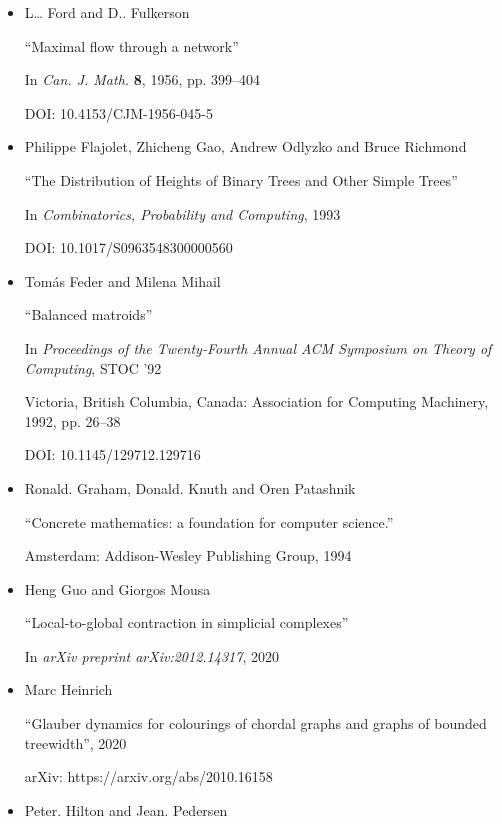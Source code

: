 \documentclass[10pt,a4paper]{article}
\begin{document}
\begin{itemize}
      

\item[] [FF56]
L… Ford and D.. Fulkerson

“Maximal flow through a network”

In \emph{Can. J. Math.} \textbf{8}, 1956, pp. 399–404

DOI: 10.4153/CJM-1956-045-5


      

\item[] [Fla+93]
Philippe Flajolet, Zhicheng Gao, Andrew Odlyzko and Bruce Richmond

“The Distribution of Heights of Binary Trees and Other Simple Trees”

In \emph{Combinatorics, Probability and Computing}, 1993

DOI: 10.1017/S0963548300000560


      

\item[] [FM92]
Tomás Feder and Milena Mihail

“Balanced matroids”

In \emph{Proceedings of the Twenty-Fourth Annual ACM Symposium on Theory of Computing}, STOC ’92

Victoria, British Columbia, Canada: Association for Computing Machinery, 1992, pp. 26–38

DOI: 10.1145/129712.129716


      

\item[] [GKP94]
Ronald. Graham, Donald. Knuth and Oren Patashnik

“Concrete mathematics: a foundation for computer science.”

Amsterdam: Addison-Wesley Publishing Group, 1994


      

\item[] [GM20]
Heng Guo and Giorgos Mousa

“Local-to-global contraction in simplicial complexes”

In \emph{arXiv preprint arXiv:2012.14317}, 2020


      

\item[] [Hei20]
Marc Heinrich

“Glauber dynamics for colourings of chordal graphs and graphs of bounded treewidth”, 2020

arXiv: https://arxiv.org/abs/2010.16158


      

\item[] [HP91]
Peter. Hilton and Jean. Pedersen


\end{itemize}
\end{document}
